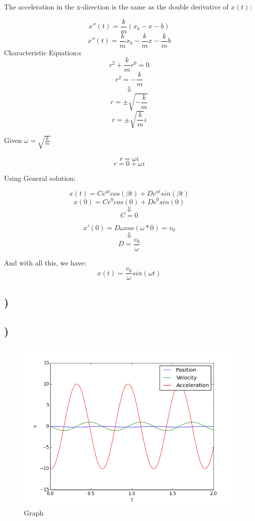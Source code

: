\documentclass[a4paper,10pt,norsk]{article}
\begin{document}
The acceleration in the x-direction is the same as the double derivative of $x(t)$:

\[x''(t) = \frac{k}{m}(x_{b} - x - b)\]
\[x''(t) = \frac{k}{m}x_{b} - \frac{k}{m}x - \frac{k}{m}b\]
Characteristic Equation:s
\[r^{2} + \frac{k}{m}r^{0} = 0\]
\[r^{2} = -\frac{k}{m}\]
\[\Downarrow\]
\[r = \pm\sqrt{-\frac{k}{m}}\]
\[r = \pm\sqrt{\frac{k}{m}}i\]

Given $\omega = \sqrt{\frac{k}{m}}$

\[r = \omega i\]
\[r = 0 + \omega i\]

Using General solution:

\[x(t) = Ce^{at}cos(\beta t) + De^{at}sin(\beta t)\]
\[x(0) = Ce^{0}cos(0) + De^{0}sin(0)\]
\[\Downarrow\]
\[C = 0\]

\[x'(0) = D\omega cos(\omega * 0) = v_{0}\]
\[\Downarrow\]
\[D = \frac{v_{0}}{\omega}\]

And with all this, we have:
\[x(t) = \frac{v_{0}}{\omega}sin(\omega t)\]

\pagebreak

\subsection{)}

\subsection{)}



\begin{figure}[h!]
        \centering 
        \includegraphics[scale=0.5]{oppg_p.png} 
        \caption{Graph}
\end{figure}
\end{document}
